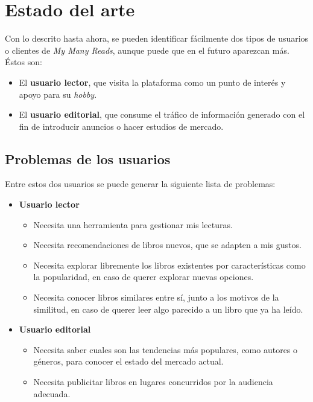 \chapter{Estado del arte}
\label{Estado del arte}

Con lo descrito hasta ahora, se pueden identificar fácilmente dos tipos de usuarios o clientes de \textit{My Many Reads}, aunque puede que en el futuro aparezcan más. Éstos son:
\begin{itemize}
    \item El \textbf{usuario lector}, que visita la plataforma como un punto de interés y apoyo para su \textit{hobby}.
    \item El \textbf{usuario editorial}, que consume el tráfico de información generado con el fin de introducir anuncios o hacer estudios de mercado.
\end{itemize}

\section{Problemas de los usuarios}
\label{problemas de los usuarios}

Entre estos dos usuarios se puede generar la siguiente lista de problemas:
\begin{itemize}
    \item \textbf{Usuario lector}
    \begin{itemize}
        \item Necesita una herramienta para gestionar mis lecturas.
        \item Necesita recomendaciones de libros nuevos, que se adapten a mis gustos.
        \item Necesita explorar libremente los libros existentes por características como la popularidad, en caso de querer explorar nuevas opciones.
        \item Necesita conocer libros similares entre sí, junto a los motivos de la similitud, en caso de querer leer algo parecido a un libro que ya ha leído.
    \end{itemize}
    \item \textbf{Usuario editorial}
    \begin{itemize}
        \item Necesita saber cuales son las tendencias más populares, como autores o géneros, para conocer el estado del mercado actual.
        \item Necesita publicitar libros en lugares concurridos por la audiencia adecuada.
    \end{itemize}
\end{itemize}

